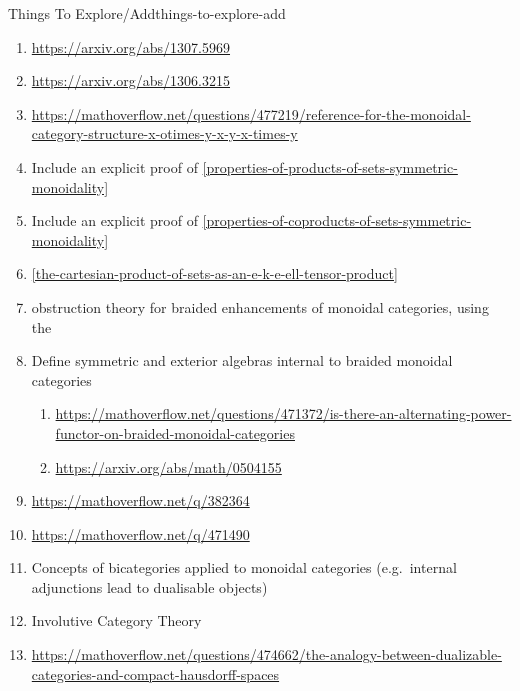\begin{remark}{Things To Explore/Add}{things-to-explore-add}
\begin{enumerate}
\begin{enumerate}
\[                        \{%
                            \text{surjections from $\{1,\ldots,m\}$ to $\{1,\ldots,n\}$}%
                        \}%
                    \]%
                    This promonad categorifies $\leq$ in that its values are the witnesses to the fact that $m$ is bigger than $n$ (i.e.\ surjections).
                \item Figure out whether this promonad extends to the 1-truncation of the sphere spectrum, and perhaps to other categorified analogues of monoids/groups/rings.
            \end{enumerate}
        \item \url{https://arxiv.org/abs/1307.5969}
        \item \url{https://arxiv.org/abs/1306.3215}
        \item \url{https://mathoverflow.net/questions/477219/reference-for-the-monoidal-category-structure-x-otimes-y-x-y-x-times-y}
        \item Include an explicit proof of \cref{properties-of-products-of-sets-symmetric-monoidality}
        \item Include an explicit proof of \cref{properties-of-coproducts-of-sets-symmetric-monoidality}
        \item \cref{the-cartesian-product-of-sets-as-an-e-k-e-ell-tensor-product}
        \item obstruction theory for braided enhancements of monoidal categories, using the 
        \item Define symmetric and exterior algebras internal to braided monoidal categories
            \begin{enumerate}
                \item \url{https://mathoverflow.net/questions/471372/is-there-an-alternating-power-functor-on-braided-monoidal-categories}
                \item \url{https://arxiv.org/abs/math/0504155}
            \end{enumerate}
        \item \url{https://mathoverflow.net/q/382364}
        \item \url{https://mathoverflow.net/q/471490}
        \item Concepts of bicategories applied to monoidal categories (e.g.\ internal adjunctions lead to dualisable objects)
        \item Involutive Category Theory
        \item \url{https://mathoverflow.net/questions/474662/the-analogy-between-dualizable-categories-and-compact-hausdorff-spaces}

\end{enumerate}
\end{remark}
